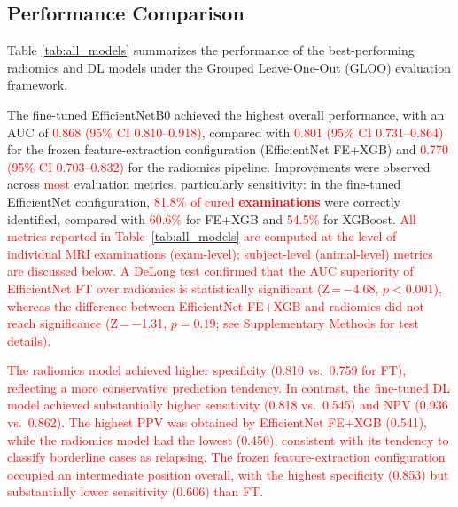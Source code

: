 \documentclass{article}
\begin{document}
\subsection{Performance Comparison}

Table \ref{tab:all_models} summarizes the performance of the best-performing radiomics and DL models under the Grouped Leave-One-Out (GLOO) evaluation framework.

The fine-tuned EfficientNetB0 achieved the highest overall performance, with an AUC of \textcolor{red}{0.868 (95\% CI 0.810--0.918)}, compared with \textcolor{red}{0.801 (95\% CI 0.731--0.864)} for the frozen feature-extraction configuration (EfficientNet FE+XGB) and \textcolor{red}{0.770 (95\% CI 0.703--0.832)} for the radiomics pipeline. Improvements were observed across \textcolor{red}{most} evaluation metrics, particularly sensitivity: in the fine-tuned EfficientNet configuration, \textcolor{red}{81.8\% of cured \textbf{examinations}} were correctly identified, compared with \textcolor{red}{60.6\%} for FE+XGB and \textcolor{red}{54.5\%} for XGBoost. \textcolor{red}{All metrics reported in Table~\ref{tab:all_models} are computed at the level of individual MRI examinations (exam-level); subject-level (animal-level) metrics are discussed below. A DeLong test \cite{DeLong1988} confirmed that the AUC superiority of EfficientNet FT over radiomics is statistically significant (Z\,=\,$-$4.68, $p < 0.001$), whereas the difference between EfficientNet FE+XGB and radiomics did not reach significance (Z\,=\,$-$1.31, $p = 0.19$; see Supplementary Methods for test details).}

\textcolor{red}{The radiomics model achieved higher specificity (0.810 vs.\ 0.759 for FT), reflecting a more conservative prediction tendency. In contrast, the fine-tuned DL model achieved substantially higher sensitivity (0.818 vs.\ 0.545) and NPV (0.936 vs.\ 0.862). The highest PPV was obtained by EfficientNet FE+XGB (0.541), while the radiomics model had the lowest (0.450), consistent with its tendency to classify borderline cases as relapsing. The frozen feature-extraction configuration occupied an intermediate position overall, with the highest specificity (0.853) but substantially lower sensitivity (0.606) than FT.}
\end{document}
